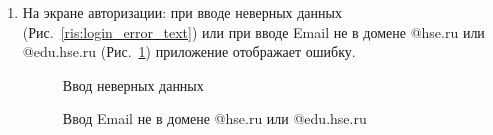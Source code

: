 \documentclass{../includes/TechDoc}
\begin{document}
    \begin{enumerate}
        \item На экране авторизации: при вводе неверных данных (Рис.~\ref{ris:login_error_text}) или при вводе Email не в домене @hse.ru или @edu.hse.ru (Рис.~\ref{ris:login_error_email}) приложение отображает ошибку.
        \begin{figure}[ht]
            \begin{center}
                \begin{minipage}[ht]{0.49\linewidth}
                    \caption{Ввод неверных данных} %
                    \label{ris:login_error_text} %
                \end{minipage}
                \hfill
                \begin{minipage}[ht]{0.49\linewidth}
                    \caption{Ввод Email не в домене @hse.ru или @edu.hse.ru}
                    \label{ris:login_error_email}
                \end{minipage}
            \end{center}
        \end{figure}


\end{enumerate}
\end{document}

